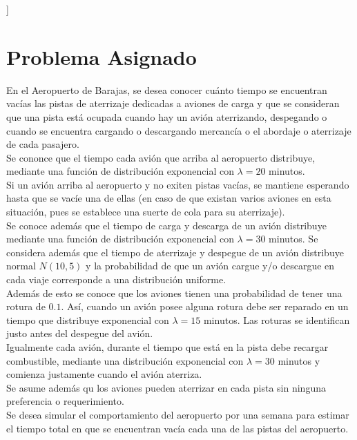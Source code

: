 \documentclass[a4paper,10pt,twocolumn]{article}
\begin{document}
\vspace{0.8cm}
]



\section{Problema Asignado}\label{sec:intro}

En el Aeropuerto de Barajas, se desea conocer cu\'anto tiempo se encuentran vac\'ias
las pistas de aterrizaje dedicadas a aviones de carga y que se consideran que una pista
est\'a ocupada cuando hay un avi\'on aterrizando, despegando o cuando se encuentra cargando 
o descargando mercanc\'ia o el abordaje o aterrizaje de cada pasajero. \\
Se cononce que el tiempo cada avi\'on que arriba al aeropuerto distribuye, mediante una funci\'on
de distribuci\'on exponencial con $\lambda = 20$ minutos. \\
Si un avi\'on arriba al aeropuerto y no exiten pistas vac\'ias, se mantiene esperando hasta que se 
vac\'ie una de ellas (en caso de que existan varios aviones en esta situaci\'on, pues se establece una suerte
de cola para su aterrizaje). \\
Se conoce adem\'as que el tiempo de carga y descarga de un avi\'on distribuye mediante una funci\'on de 
distribuci\'on exponencial con $\lambda = 30$ minutos. Se considera adem\'as que el tiempo de aterrizaje y despegue de
un avi\'on distribuye normal $N(10,5)$ y la probabilidad de que un avi\'on cargue y/o descargue en cada viaje corresponde a una distribuci\'on
uniforme. \\
Adem\'as de esto se conoce que los aviones tienen una probabilidad de tener una rotura de $0.1$. As\'i, cuando un avi\'on posee alguna rotura debe
ser reparado en un tiempo que distribuye exponencial con $\lambda = 15$ minutos. Las roturas se identifican justo antes del despegue del avi\'on.\\
Igualmente cada avi\'on, durante el tiempo que est\'a en la pista debe recargar combustible, mediante una distribuci\'on exponencial con $\lambda = 30$
minutos y comienza justamente cuando el avi\'on aterriza.\\
Se asume adem\'as qu los aviones pueden aterrizar en cada pista sin ninguna preferencia o requerimiento. \\
Se desea simular el comportamiento del aeropuerto por una semana para estimar el tiempo total en que se encuentran vac\'ia cada una de las pistas del
aeropuerto.
\end{document}
